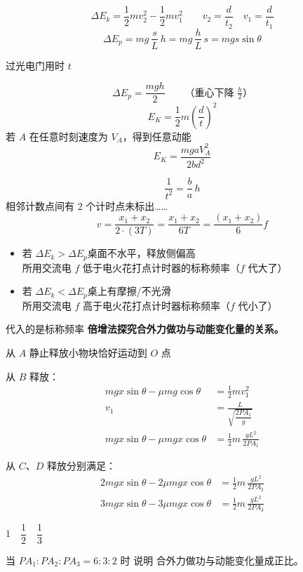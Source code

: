 \[ \Delta E_k=\frac12mv_2^2-\frac12mv_1^2\qquad v_2=\frac{d}{t_2}\quad v_1=\frac{d}{t_1} \]
\[ \Delta E_p=mg\,\frac{s}{L}\,h=mg\,\frac{h}{L}\,s=mgs\sin\theta \]

过光电门用时 $t$

\[ \Delta E_p=\frac{mgh}{2}\qquad\text{（重心下降 }\tfrac{h}{2}\text{）} \]
\[ E_K=\frac12m\left(\frac{d}{t}\right)^2 \]
若 $A$ 在任意时刻速度为 $V_A$，得到任意动能
\[ E_K=\frac{mgaV_A^2}{2bd^2} \]


\[ \frac{1}{t^2}=\frac{b}{a}\,h \]
相邻计数点间有 2 个计时点未标出\ldots\ldots
\[ v=\frac{x_1+x_2}{2\cdot(3T)}=\frac{x_1+x_2}{6T}=\frac{(x_1+x_2)}{6}f \]

\begin{itemize}
\item 若 $\Delta E_k>\Delta E_p$\quad 桌面不水平，释放侧偏高 \\
所用交流电 $f$ 低于电火花打点计时器的标称频率（$f$ 代大了） %
\item 若 $\Delta E_k<\Delta E_p$\quad 桌上有摩擦/不光滑 \\
所用交流电 $f$ 高于电火花打点计时器标称频率（$f$ 代小了）
\end{itemize}

代入的是标称频率
\textbf{倍增法探究合外力做功与动能变化量的关系。}


从 $A$ 静止释放小物块恰好运动到 $O$ 点

从 $B$ 释放：
\begin{align*}
mgx\sin\theta-\mu mg\cos\theta&=\frac12mv_1^2\\
v_1&=\frac{L}{\sqrt{\dfrac{2PA_1}{g}}}\\
mgx\sin\theta-\mu mgx\cos\theta&=\frac12m\,\frac{gL^2}{2PA_1}
\end{align*}

从 $C$、$D$ 释放分别满足：
\begin{align*}
2mgx\sin\theta-2\mu mgx\cos\theta&=\frac12m\,\frac{gL^2}{2PA_2}\\
3mgx\sin\theta-3\mu mgx\cos\theta&=\frac12m\,\frac{gL^2}{2PA_3}
\end{align*}

$1\quad\dfrac12\quad\dfrac13$

当 $PA_1:PA_2:PA_3=6:3:2$ 时 说明 合外力做功与动能变化量成正比。
